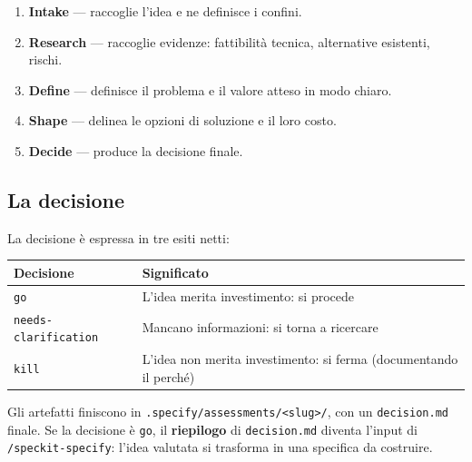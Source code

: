\documentclass[
  italian,
  10pt,
]{book}
\newcounter{none} %
\providecommand{\tightlist}{%
  \setlength{\itemsep}{0pt}\setlength{\parskip}{0pt}}
\begin{document}
\begin{enumerate}
\def\labelenumi{\arabic{enumi}.}
\tightlist
\item
  \textbf{Intake} --- raccoglie l'idea e ne definisce i confini.
\item
  \textbf{Research} --- raccoglie evidenze: fattibilità tecnica,
  alternative esistenti, rischi.
\item
  \textbf{Define} --- definisce il problema e il valore atteso in modo
  chiaro.
\item
  \textbf{Shape} --- delinea le opzioni di soluzione e il loro costo.
\item
  \textbf{Decide} --- produce la decisione finale.
\end{enumerate}

\subsection{La decisione}\label{la-decisione}

La decisione è espressa in tre esiti netti:

{\def\LTcaptype{none} %
\begin{longtable}[]{@{}
  >{\raggedright\arraybackslash}p{}
  >{\raggedright\arraybackslash}p{}@{}}
\toprule\noalign{}
\begin{minipage}[b]{\linewidth}\raggedright
Decisione
\end{minipage} & \begin{minipage}[b]{\linewidth}\raggedright
Significato
\end{minipage} \\
\midrule\noalign{}
\endhead
\bottomrule\noalign{}
\endlastfoot
\texttt{go} & L'idea merita investimento: si procede \\
\texttt{needs-clarification} & Mancano informazioni: si torna a
ricercare \\
\texttt{kill} & L'idea non merita investimento: si ferma (documentando
il perché) \\
\end{longtable}
}

Gli artefatti finiscono in
\texttt{.specify/assessments/\textless{}slug\textgreater{}/}, con un
\texttt{decision.md} finale. Se la decisione è \texttt{go}, il
\textbf{riepilogo} di \texttt{decision.md} diventa l'input di
\texttt{/speckit-specify}: l'idea valutata si trasforma in una specifica
da costruire.
\end{document}
